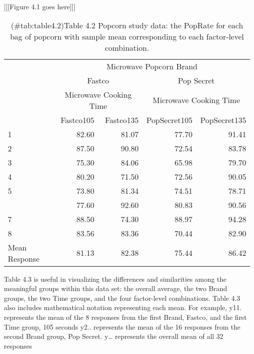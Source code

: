 \documentclass[
]{report}
\theoremstyle{definition}
\theoremstyle{definition}
\theoremstyle{definition}
\theoremstyle{definition}
\theoremstyle{remark}
\begin{document}
{[}{[}{[}Figure 4.1 goes here{]}{]}{]}

\begin{table}

\caption{(\#tab:table4.2)Table 4.2 Popcorn study data: the PopRate for each bag of popcorn with sample mean corresponding to each factor‐level combination.}
\centering
\begin{tabular}[t]{lrrrr}
\toprule
\multicolumn{1}{c}{ } & \multicolumn{4}{c}{Microwave Popcorn Brand} \\
\cmidrule(l{3pt}r{3pt}){2-5}
\multicolumn{1}{c}{ } & \multicolumn{2}{c}{Fastco} & \multicolumn{2}{c}{Pop Secret} \\
\cmidrule(l{3pt}r{3pt}){2-3} \cmidrule(l{3pt}r{3pt}){4-5}
\multicolumn{1}{c}{ } & \multicolumn{2}{c}{Microwave Cooking Time} & \multicolumn{2}{c}{Microwave Cooking Time} \\
\cmidrule(l{3pt}r{3pt}){2-3} \cmidrule(l{3pt}r{3pt}){4-5}
  & Fastco105 & Fastco135 & PopSecret105 & PopSecret135\\
\midrule
1 & 82.60 & 81.07 & 77.70 & 91.41\\
2 & 87.50 & 90.80 & 72.54 & 83.78\\
3 & 75.30 & 84.06 & 65.98 & 79.70\\
4 & 80.20 & 71.50 & 72.56 & 90.05\\
5 & 73.80 & 81.34 & 74.51 & 78.71\\
\addlinespace
6 & 77.60 & 92.60 & 80.83 & 90.56\\
7 & 88.50 & 74.30 & 88.97 & 94.28\\
8 & 83.56 & 83.36 & 70.44 & 82.90\\
Mean Response & 81.13 & 82.38 & 75.44 & 86.42\\
\bottomrule
\end{tabular}
\end{table}

Table 4.3 is useful in visualizing the differences and similarities among the meaningful groups within this
data set: the overall average, the two Brand groups, the two Time groups, and the four factor-level combinations. Table 4.3 also includes mathematical notation representing each mean. For example, y11. represents the
mean of the 8 responses from the first Brand, Fastco, and the first Time group, 105 seconds y2.. represents
the mean of the 16 responses from the second Brand group, Pop Secret. y\ldots{} represents the overall mean of
all 32 responses
\end{document}

